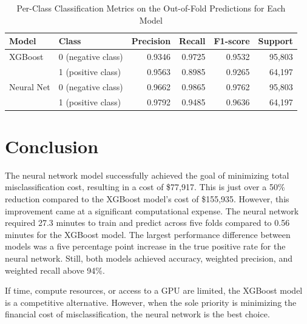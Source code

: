 \documentclass{article}
\begin{document}
\begin{table}[!htbp]
    \centering
    \caption{Per-Class Classification Metrics on the Out-of-Fold Predictions for Each Model}
    \begin{tabular}{llrrrr}
    \arrayrulecolor{black}
    \toprule
    \textbf{Model} & \textbf{Class} & \textbf{Precision} & \textbf{Recall} & \textbf{F1-score} & \textbf{Support} \\
    \midrule
    XGBoost & 0 (negative class) & 0.9346 & 0.9725 & 0.9532 & 95{,}803 \\
    & 1 (positive class)  & 0.9563 & 0.8985 & 0.9265 & 64{,}197 \\
    \midrule
    Neural Net & 0 (negative class) & 0.9662 & 0.9865 & 0.9762 & 95{,}803 \\
    & 1 (positive class)  & 0.9792 & 0.9485 & 0.9636 & 64{,}197 \\
    \bottomrule
    \end{tabular}
    \label{table:metrics_by_class}
\end{table}

\section{Conclusion}

The neural network model successfully achieved the goal of minimizing total misclassification cost, resulting in a cost of \$77{,}917. This is just over a 50\% reduction compared to the XGBoost model's cost of \$155{,}935. However, this improvement came at a significant computational expense. The neural network required 27.3 minutes to train and predict across five folds compared to 0.56 minutes for the XGBoost model. The largest performance difference between models was a five percentage point increase in the true positive rate for the neural network. Still, both models achieved accuracy, weighted precision, and weighted recall above 94\%.

If time, compute resources, or access to a GPU are limited, the XGBoost model is a competitive alternative. However, when the sole priority is minimizing the financial cost of misclassification, the neural network is the best choice.
\end{document}

